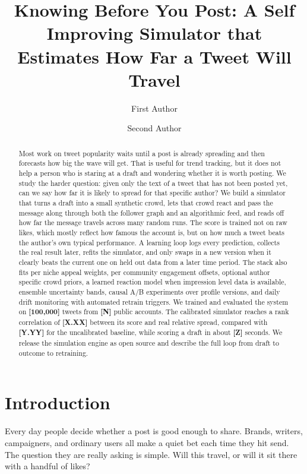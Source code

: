 \documentclass[11pt]{article}
\title{Knowing Before You Post: A Self Improving Simulator that Estimates How Far a Tweet Will Travel}
\author[1]{First Author}
\author[1]{Second Author}
\affil[1]{Your Affiliation, City, Country}
\affil[ ]{\texttt{\{first, second\}@youruniversity.edu}}
\date{}
\newcommand{\fill}[1]{\textbf{[#1]}}
\begin{document}
\maketitle

\begin{abstract}
\noindent
Most work on tweet popularity waits until a post is already spreading and then
forecasts how big the wave will get. That is useful for trend tracking, but it
does not help a person who is staring at a draft and wondering whether it is
worth posting. We study the harder question: given only the text of a tweet
that has not been posted yet, can we say how far it is likely to spread for that
specific author? We build a simulator that turns a draft into a small synthetic
crowd, lets that crowd react and pass the message along through both the
follower graph and an algorithmic feed, and reads off how far the message
travels across many random runs. The score is trained not on raw likes, which
mostly reflect how famous the account is, but on how much a tweet beats the
author's own typical performance. A learning loop logs every prediction,
collects the real result later, refits the simulator, and only swaps in a new
version when it clearly beats the current one on held out data from a later time
period. The stack also fits per niche appeal weights, per community engagement
offsets, optional author specific crowd priors, a learned reaction model when
impression level data is available, ensemble uncertainty bands, causal A/B
experiments over profile versions, and daily drift monitoring with automated
retrain triggers. We trained and evaluated the system on \fill{100{,}000} tweets
from \fill{N} public accounts. The calibrated simulator reaches a rank
correlation of \fill{X.XX} between its score and real relative spread, compared
with \fill{Y.YY} for the uncalibrated baseline, while scoring a draft in about
\fill{Z} seconds. We release the simulation engine as open source and describe
the full loop from draft to outcome to retraining.
\end{abstract}

\section{Introduction}

Every day people decide whether a post is good enough to share. Brands, writers,
campaigners, and ordinary users all make a quiet bet each time they hit send.
The question they are really asking is simple. Will this travel, or will it sit
there with a handful of likes?
\end{document}
